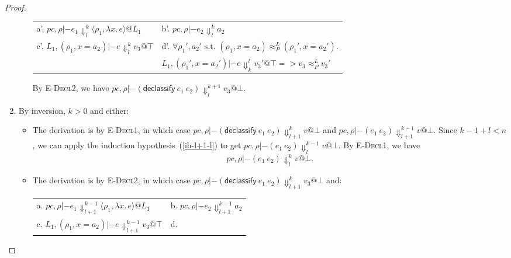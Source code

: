 \documentclass{article}
\makeatletter
\theoremstyle{definition}
\newcommand{\at}{\ensuremath{{\scriptstyle{@}}}}
\newcommand{\pc}{\ensuremath{{\mathit{pc}}}}
\makeatother
\begin{document}
\begin{proof}
\begin{enumerate}
\begin{itemize}
\begin{center}
        \begin{tabular*}{1.0\linewidth}{l@{\qquad}l}
          a'.
          $\pc, \rho |- e_1
          \Downarrow^{k}_{l}
          \langle{\rho_1, \lambda{x}.\, e\rangle} \at L_1$
          &
          b'.
          $\pc, \rho |- e_2
          \Downarrow^{k}_{l}
          a_2$
          \\[1.8ex]
          c'.
          $L_1, (\rho_1, x = a_2) |- e
          \Downarrow^{k}_{l}
          v_3 \at \top$
          &
          d'.
          $\forall{\rho_1', a_2' \text{ s.t. }
            (\rho_1, x = a_2) \approx^{L}_{P} (\rho_1', x = a_2')}.$
          \\
          &
          \quad\quad
          $L_1, (\rho_1', x = a_2') |- e \Downarrow^{l}_{k} v_3' \at \top =>
          v_3 \approx^{L}_{P} v_3'$
        \end{tabular*}
      \end{center}
      By \textsc{E-Decl2}, we have
      $\pc, \rho |- (\mathsf{declassify}\ e_1\ e_2)
      \Downarrow^{k+1}_{l}
      v_3 \at \bot$.
    \end{itemize}
  \item By inversion, $k > 0$ and either:
    \begin{itemize}
    \item The derivation is by \textsc{E-Decl1},
      in which case
      $\pc, \rho |- (\mathsf{declassify}\ e_1\ e_2)
      \Downarrow^{k}_{l+1}
      v \at \bot$ and
      $\pc, \rho |- (e_1\ e_2) \Downarrow^{k-1}_{l+1} v \at \bot$.
      Since $k-1 + l < n$, we can apply the induction
      hypothesis~(\ref{ih-l+1-l}) to get
      $\pc, \rho |- (e_1\ e_2) \Downarrow^{k-1}_{l} v \at \bot$.
      By \textsc{E-Decl1}, we have
      \[ \pc, \rho |- (e_1\ e_2) \Downarrow^{k}_{l} v \at \bot. \]
    \item The derivation is by \textsc{E-Decl2},
      in which case
      $\pc, \rho |- (\mathsf{declassify}\ e_1\ e_2)
      \Downarrow^{k}_{l+1}
      v_3 \at \bot$ and:
      \begin{center}
        \begin{tabular*}{1.0\linewidth}{ll}
          a.
          $\pc, \rho |- e_1
          \Downarrow^{k-1}_{l+1}
          \langle{\rho_1, \lambda{x}.\, e\rangle} \at L_1$
          &
          b.
          $\pc, \rho |- e_2
          \Downarrow^{k-1}_{l+1}
          a_2$
          \\[1.8ex]
          c.
          $L_1, (\rho_1, x = a_2) |- e
          \Downarrow^{k-1}_{l+1}
          v_3 \at \top$
          &
          d.

\end{tabular*}
\end{center}
\end{itemize}
\end{enumerate}
\end{proof}
\end{document}
